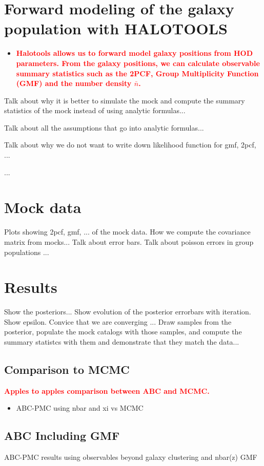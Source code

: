 \documentclass[12pt, preprint]{aastex}
\newcommand{\todo}[1]{{\bf \textcolor{red}{ #1}}}
\begin{document}
\section{Forward modeling of the galaxy population with HALOTOOLS}

\begin{itemize}
\item \todo{Halotools allows us to forward model galaxy positions from HOD parameters. From the galaxy positions, we can calculate observable summary statistics such as the 2PCF, Group Multiplicity Function (GMF) and the number density $\bar{n}$.}

\end{itemize}
Talk about why it is better to simulate the mock and compute the summary statistics of the mock instead of 
using analytic formulas...

Talk about all the assumptions that go into analytic formulas...

Talk about why we do not want to write down likelihood function for gmf, 2pcf, ...

...


\section{Mock data}
Plots showing 2pcf, gmf, ... of the mock data.
How we compute the covariance matrix from mocks...
Talk about error bars. Talk about poisson errors in group populations ... 

\section{Results}
Show the posteriors...
Show evolution of the posterior errorbars with iteration. Show epsilon. Convice that we are converging ...
Draw samples from the posterior, populate the mock catalogs with those samples, and compute the summary statistcs with them 
and demonstrate that they match the data...

\subsection{Comparison to MCMC}
\todo{Apples to apples comparison between ABC and MCMC.}
\begin{itemize}
\item ABC-PMC using nbar and xi vs MCMC
\cite{Ishida:2015aa}
\end{itemize}

\subsection{ABC Including GMF}
ABC-PMC results using observables beyond galaxy clustering and nbar(z) GMF
\end{document}
